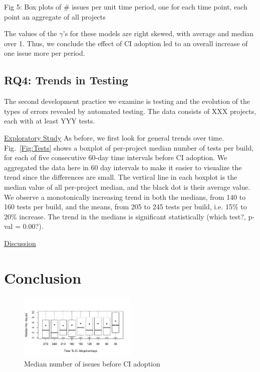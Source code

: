\documentclass[conference]{IEEEtran}
\begin{document}
Fig 5: Box plots of \# issues per unit time period, one for each time point, each point an aggregate of all projects



The values of the $\gamma$'s for these models are right skewed, with average and median over 1. Thus, we conclude the effect of CI adoption led to an overall increase of one issue more per period.




\subsection{RQ4: Trends in Testing}

The second development practice we examine is testing and the evolution of the types of errors revealed by automated testing.
The data consists of XXX projects, each with at least YYY tests.

\noindent \underline{Exploratory Study} As before, we first look for general trends over time.
Fig.~\ref{Fig:Tests} shows a boxplot of per-project median number of tests per build, for each of five consecutive 60-day time intervals before CI adoption.
We aggregated the data here in 60 day intervals to make it easier to visualize the trend since the differences are small.
The vertical line in each boxplot is the median value of all per-project median, and the black dot is their average value.
We observe a monotonically increasing trend in both the medians, from 140 to 160 tests per build, and the means, from 205 to 245 tests per build, i.e. 15\% to 20\% increase. The trend in the medians is significant statistically (which test?, p-val = 0.00?).


\noindent \underline{Discussion}



\section{Conclusion}

\begin{figure}[!t]
\centering
\includegraphics[width=0.5\textwidth]{issues_before.pdf}
\caption{Median number of issues before CI adoption}
\label{Fig:IssuesBefore}
\end{figure}
\end{document}
